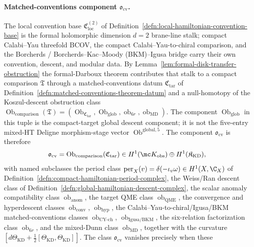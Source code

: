 \documentclass[11pt]{memoir}
\begin{document}
\paragraph{\texorpdfstring{Matched-conventions component \(\mathfrak o_{\mathrm{cv}}\).}{Matched-conventions component o-cv.}}
The local convention base \(\mathfrak C_{\mathrm{loc}}^{(2)}\) of
Definition~\ref{defn:local-hamiltonian-convention-base} is the formal
holomorphic dimension \(d=2\) brane-line stalk; compact Calabi--Yau threefold BCOV,
the compact Calabi--Yau-to-chiral comparison, and the Borcherds /
Borcherds--Kac--Moody (BKM)--Igusa bridge carry
their own convention, descent, and modular data.  By
Lemma~\ref{lem:formal-disk-transfer-obstruction} the formal-Darboux theorem
contributes that stalk to a compact comparison \(\mathfrak T\) through a
matched-conventions datum
\(\mathfrak C_{\mathrm{tar}}\) of
Definition~\ref{defn:matched-conventions-theorem-datum} and a
null-homotopy of the Koszul-descent obstruction class
\(\operatorname{Ob}_{\mathrm{comparison}}(\mathfrak T)=
(\operatorname{Ob}_{\mathfrak C_{\mathrm{tar}}},
\operatorname{Ob}_{\mathrm{glob}},
\operatorname{ob}_{6r},\operatorname{ob}_{\mathrm{MD}})\).  The
component \(\operatorname{Ob}_{\mathrm{glob}}\) in this tuple is the
compact-target global descent component; it is not the five-entry
mixed-HT Deligne morphism-stage vector
\(\operatorname{Ob}^{\mathrm{global},5}\).
The
component \(\mathfrak o_{\mathrm{cv}}\) is therefore
\[
  \mathfrak o_{\mathrm{cv}}
    =
    \operatorname{Ob}_{\mathrm{comparison}}(\mathfrak C_{\mathrm{tar}})
    \in
    H^1(\mc K_{\mathrm{obs}})\oplus H^1(\mathfrak K_{\mathrm{KD}}),
\]
with named subclasses the period class
\(\operatorname{per}_X(v)=\delta(-\iota_v\omega)\in H^1(X,\C_X)\) of
Definition~\ref{defn:compact-hamiltonian-period-complex}, the
Weiss/Ran descent class of
Definition~\ref{defn:global-hamiltonian-descent-complex}, the scalar
anomaly compatibility class \(\operatorname{ob}_{\mathrm{anom}}\), the
target QME class \(\operatorname{ob}_{\mathrm{QME}}\), the
convergence and hyperdescent classes
\(\operatorname{ob}_{\mathrm{conv}}\),
\(\operatorname{ob}_{\mathrm{hyp}}\), the Calabi--Yau-to-chiral/Igusa/BKM
matched-conventions classes
\(\operatorname{ob}_{\mathrm{CY\mbox{-}ch}}\),
\(\operatorname{ob}_{\mathrm{Igusa/BKM}}\), the six-relation factorization
class \(\operatorname{ob}_{6r}\), and the mixed-Dunn class
\(\operatorname{ob}_{\mathrm{MD}}\), together with the curvature
\([d\Theta_{\mathrm{KD}}+\tfrac12[\Theta_{\mathrm{KD}},\Theta_{\mathrm{KD}}]]\).
The class \(\mathfrak o_{\mathrm{cv}}\) vanishes precisely when these
\end{document}
